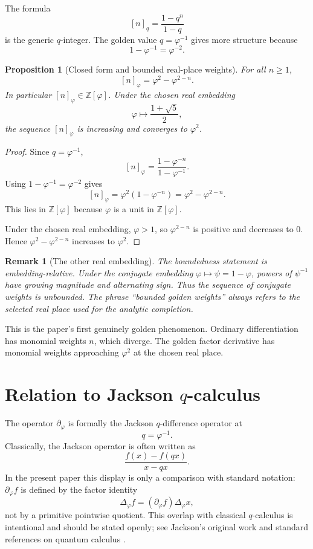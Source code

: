 \documentclass[11pt]{article}
\newtheorem{proposition}[definition]{Proposition}
\newtheorem{remark}[definition]{Remark}
\newcommand{\ph}{\varphi}
\newcommand{\ps}{\psi}
\newcommand{\Z}{\mathbb{Z}}
\newcommand{\dd}{\partial_{\ph}}
\newcommand{\Del}{\Delta_{\ph}}
\begin{document}
The formula
\[
    [n]_q=\frac{1-q^n}{1-q}
\]
is the generic $q$-integer.  The golden value $q=\ph^{-1}$ gives more structure because
\[
    1-\ph^{-1}=\ph^{-2}.
\]

\begin{proposition}[Closed form and bounded real-place weights]
For all $n\ge1$,
\[
    [n]_{\ph}=\ph^2-\ph^{2-n}.
\]
In particular $[n]_{\ph}\in\Z[\ph]$.  Under the chosen real embedding
\[
    \ph\mapsto \frac{1+\sqrt5}{2},
\]
the sequence $[n]_{\ph}$ is increasing and converges to $\ph^2$.
\end{proposition}

\begin{proof}
Since $q=\ph^{-1}$,
\[
    [n]_{\ph}=\frac{1-\ph^{-n}}{1-\ph^{-1}}.
\]
Using $1-\ph^{-1}=\ph^{-2}$ gives
\[
    [n]_{\ph}=\ph^2(1-\ph^{-n})=\ph^2-\ph^{2-n}.
\]
This lies in $\Z[\ph]$ because $\ph$ is a unit in $\Z[\ph]$.

Under the chosen real embedding, $\ph>1$, so $\ph^{2-n}$ is positive and decreases to $0$.  Hence $\ph^2-\ph^{2-n}$ increases to $\ph^2$.
\end{proof}

\begin{remark}[The other real embedding]
The boundedness statement is embedding-relative.  Under the conjugate embedding $\ph\mapsto\ps=1-\ph$, powers of $\ps^{-1}$ have growing magnitude and alternating sign.  Thus the sequence of conjugate weights is unbounded.  The phrase ``bounded golden weights'' always refers to the selected real place used for the analytic completion.
\end{remark}

This is the paper's first genuinely golden phenomenon.  Ordinary differentiation has monomial weights $n$, which diverge.  The golden factor derivative has monomial weights approaching $\ph^2$ at the chosen real place.

\section{Relation to Jackson \texorpdfstring{$q$}{q}-calculus}

The operator $\dd$ is formally the Jackson $q$-difference operator at
\[
    q=\ph^{-1}.
\]
Classically, the Jackson operator is often written as
\[
    \frac{f(x)-f(qx)}{x-qx}.
\]
In the present paper this display is only a comparison with standard notation: $\dd f$ is defined by the factor identity
\[
    \Del f=(\dd f)\Del x,
\]
not by a primitive pointwise quotient.  This overlap with classical $q$-calculus is intentional and should be stated openly; see Jackson's original work and standard references on quantum calculus \cite{jackson1909,kaccheung}.
\end{document}
